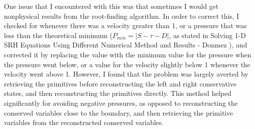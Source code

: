One issue that I encountered with this was that sometimes I would get nonphysical results from the root-finding algorithm. In order to correct this, I checked for whenever there was a velocity greater than 1, or a pressure that was less than the theoretical minimum ($P_{min}=|S-\tau-D|$, as stated in Solving 1-D SRH Equations Using Different Numerical Method and Results - Donmez ), and corrected it by replacing the value with the minimum value for the pressure when the pressure went below, or a value for the velocity slightly below 1 whenever the velocity went above 1. However, I found that the problem was largely averted by retrieving the primitives before reconstructing the left and right conservative states, and then reconstructing the primitives directly. This method helped significantly for avoiding negative pressures, as opposed to reconstructing the conserved variables close to the boundary, and then retrieving the primitive variables from the reconstructed conserved variables.

